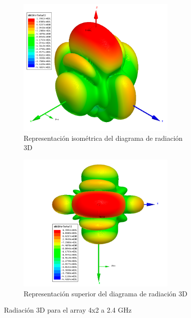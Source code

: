 \begin{figure}[H]
     \centering
     \begin{subfigure}[b]{0.7\textwidth}
         \centering
         \includegraphics[width=0.85\textwidth]{archivos/analisis/4x21/6}
         \caption{Representación isométrica del diagrama de radiación 3D}
         \label{fig:3d14x21}
     \end{subfigure}
     \hfill
     \begin{subfigure}[b]{0.7\textwidth}
         \centering
         \includegraphics[width=0.85\textwidth]{archivos/analisis/4x21/7}
         \caption{Representación superior del diagrama de radiación 3D}
         \label{fig:3d24x21}
     \end{subfigure}
     \hfill
        \caption{Radiación 3D para el array 4x2 a 2.4 GHz}
        \label{fig:3d4x21}
\end{figure}

